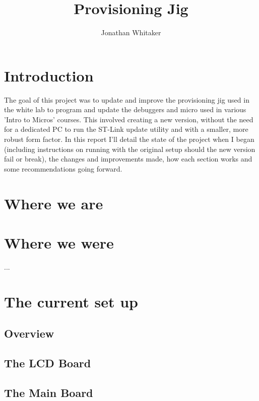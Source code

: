 \documentclass[a4paper]{article}
\title{Provisioning Jig}
\author{Jonathan Whitaker}
\begin{document}
\maketitle


\section{Introduction}

The goal of this project was to update and improve the provisioning jig used in the white lab to program and update the debuggers and micro used in various 'Intro to Micros' courses. This involved creating a new version, without the need for a dedicated PC to run the ST-Link update utility and with a smaller, more robust form factor. In this report I'll detail the state of the project when I began (including instructions on running with the original setup should the new version fail or break), the changes and improvements made, how each section works and some recommendations going forward. 

\section{Where we are}

\section{Where we were}

...

\section{The current set up}

\subsection{Overview}

\subsection{The LCD Board}

\subsection{The Main Board}
\end{document}
